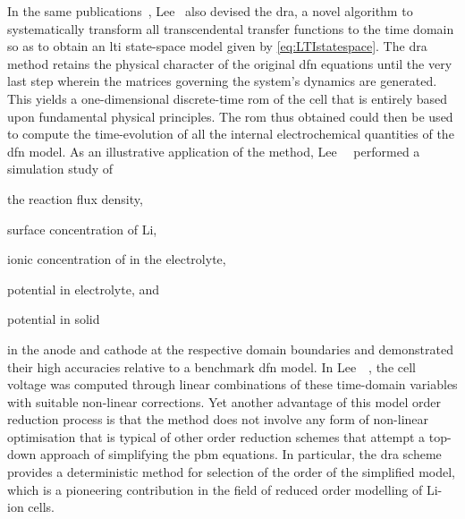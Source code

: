 In the  same publications~\cite{Lee2012a,Lee2012}, Lee~\etal{} also  devised the
\gls{dra},  a novel  algorithm  to systematically  transform all  transcendental
transfer functions to  the time domain so as to  obtain an \gls{lti} state-space
model  given  by \cref{eq:LTIstatespace}.  The   \gls{dra}  method  retains  the
physical character of the original \gls{dfn}  equations until the very last step
wherein the matrices governing the  system's dynamics are generated. This yields
a one-dimensional  discrete-time \gls{rom}  of the cell  that is  entirely based
upon fundamental  physical principles.  The \gls{rom}  thus obtained  could then
be  used to  compute  the  time-evolution of  all  the internal  electrochemical
quantities of the \gls{dfn} model. As an illustrative application of the method,
Lee~\etal~\cite{Lee2012a} performed a simulation study of
\begin{enumerate*}[label=\itshape\alph*\upshape)]
    \item the reaction flux density,
    \item surface concentration of Li,
    \item ionic concentration of  in the electrolyte,
    \item potential in electrolyte, and
    \item potential in solid
\end{enumerate*}
in   the  anode   and  cathode   at   the  respective   domain  boundaries   and
demonstrated  their high  accuracies relative  to a  benchmark \gls{dfn}  model.
In  Lee~\etal~\cite{Lee2012,Lee2012a}, the  cell  voltage  was computed  through
linear  combinations of  these  time-domain variables  with suitable  non-linear
corrections. Yet another advantage of this model order reduction process is that
the method does not involve any  form of non-linear optimisation that is typical
of other order reduction schemes that attempt a top-down approach of simplifying
the \gls{pbm} equations. In  particular, the \gls{dra} scheme provides
a deterministic method for selection of the order of the simplified model, which
is a pioneering  contribution in the field of reduced  order modelling of Li-ion
cells.


